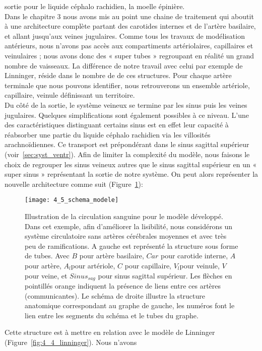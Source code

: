 sortie pour le liquide céphalo rachidien, la moelle épinière.\\
Dans le chapitre 3 nous avons mis au point une chaine de traitement qui aboutit à une
architecture complète partant des carotides internes et de l’artère basilaire, et allant jusqu’aux veines
jugulaires. Comme tous les travaux de modélisation antérieurs, nous n’avons pas accès aux
compartiments artériolaires, capillaires et veinulaires ; nous avons donc des « super tubes »
regroupant en réalité un grand nombre de vaisseaux. La différence de notre travail avec celui par
exemple de Linninger, réside dans le nombre de de ces structures. Pour chaque artère terminale que
nous pouvons identifier, nous retrouverons un ensemble artériole, capillaire, veinule définissant un
territoire.\\
Du côté de la sortie, le système veineux se termine par les sinus puis les veines jugulaires.
Quelques simplifications sont également possibles à ce niveau. L’une des caractéristiques distinguant
certains sinus est en effet leur capacité à réabsorber une partie du liquide céphalo rachidien via les
villosités arachnoïdiennes. Ce transport est prépondérant dans le sinus sagittal supérieur (voir~\ref{sec:syst_ventr}). Afin de limiter la complexité du modèle, nous faisons le choix de regrouper les sinus veineux autres
que le sinus sagittal supérieur en un « super sinus » représentant la sortie de notre système. On peut
alors représenter la nouvelle architecture comme suit (Figure~\ref{fig:4_5_schema_modele}):
\begin{figure}[!t]
\centering
\texttt{[image: 4\_5\_schema\_modele]}
\caption{Illustration de la circulation sanguine pour le modèle développé. Dans cet exemple, afin d’améliorer la lisibilité,
nous considérons un système circulatoire sans artères cérébrales moyennes et avec très peu de ramifications. A gauche est
représenté la structure sous forme de tubes. Avec $B$ pour artère basilaire, $Car$ pour carotide interne, $A$ pour artère, $A_l $pour
artériole, $C$ pour capillaire, $V_l $pour veinule, $V$ pour veine, et $Sinus_{sag}$ pour sinus sagittal supérieur. Les flèches en pointillés
orange indiquent la présence de liens entre ces artères (communicantes). Le schéma de droite illustre la structure
anatomique correspondant au graphe de gauche, les numéros font le lien entre les segments du schéma et le tubes du
graphe.
}
\label{fig:4_5_schema_modele}	
\end{figure}
Cette structure est à mettre en relation avec le modèle de Linninger (Figure~\ref{fig:4_4_linninger}). Nous n’avons
